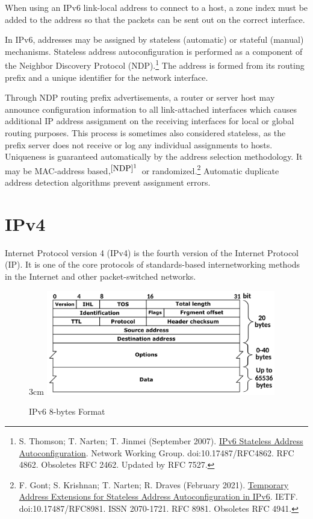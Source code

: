 \documentclass[a4paper,12pt]{book}
\begin{document}
When using an IPv6 link-local address to connect to a host, a zone index must be added to the address so that the packets can be sent out on the correct interface.

In IPv6, addresses may be assigned by stateless (automatic) or stateful (manual) mechanisms. Stateless address autoconfiguration is performed as a component of the Neighbor Discovery Protocol (NDP).\footnote{\label{NDP} S. Thomson; T. Narten; T. Jinmei (September 2007). \href{https://datatracker.ietf.org/doc/html/rfc4862}{IPv6 Stateless Address Autoconfiguration}. Network Working Group. doi:10.17487/RFC4862. RFC 4862. Obsoletes RFC 2462. Updated by RFC 7527.} The address is formed from its routing prefix and a unique identifier for the network interface.

Through NDP routing prefix advertisements, a router or server host may announce configuration information to all link-attached interfaces which causes additional IP address assignment on the receiving interfaces for local or global routing purposes. This process is sometimes also considered stateless, as the prefix server does not receive or log any individual assignments to hosts. Uniqueness is guaranteed automatically by the address selection methodology. It may be MAC-address based$,^{\footnotemark[1 \ref{NDP}]}$  or randomized.\footnote{\label{randomized} F. Gont; S. Krishnan; T. Narten; R. Draves (February 2021). \href{https://datatracker.ietf.org/doc/html/rfc8981}{Temporary Address Extensions for Stateless Address Autoconfiguration in IPv6}. IETF. doi:10.17487/RFC8981. ISSN 2070-1721. RFC 8981. Obsoletes RFC 4941.} Automatic duplicate address detection algorithms prevent assignment errors.



\section{IPv4}

Internet Protocol version 4 (IPv4) is the fourth version of the Internet Protocol (IP). It is one of the core protocols of standards-based internetworking methods in the Internet and other packet-switched networks.

\begin{figure}{3cm}
\centering
\includegraphics[width=10cm]{./IPv4_Packet-en.svg.PNG}
\caption{IPv6 8-bytes Format }\label{wrap-fig:9}
\end{figure}
\end{document}
